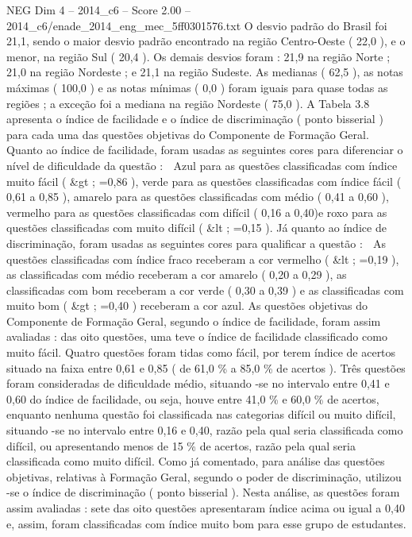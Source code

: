\begin{textsample}{NEG Dim 4 – 2014\_c6 – Score 2.00 – 2014\_c6/enade\_2014\_eng\_mec\_5ff0301576.txt}
O desvio padrão do Brasil foi 21,1, sendo o maior desvio padrão encontrado na região Centro-Oeste ( 22,0 ), e o menor, na região Sul ( 20,4 ).
Os demais desvios foram : 21,9 na região Norte ; 21,0 na região Nordeste ; e 21,1 na região Sudeste.
As medianas ( 62,5 ), as notas máximas ( 100,0 ) e as notas mínimas ( 0,0 ) foram iguais para quase todas as regiões ; a exceção foi a mediana na região Nordeste ( 75,0 ).
A Tabela 3.8 apresenta o índice de facilidade e o índice de discriminação ( ponto bisserial ) para cada uma das questões objetivas do Componente de Formação Geral.
Quanto ao índice de facilidade, foram usadas as seguintes cores para diferenciar o nível de dificuldade da questão :  Azul para as questões classificadas com índice muito fácil ( \&gt ; =0,86 ), verde para as questões classificadas com índice fácil ( 0,61 a 0,85 ), amarelo para as questões classificadas com médio ( 0,41 a 0,60 ), vermelho para as questões classificadas com difícil ( 0,16 a 0,40)e roxo para as questões classificadas com muito difícil ( \&lt ; =0,15 ).
Já quanto ao índice de discriminação, foram usadas as seguintes cores para qualificar a questão :  As questões classificadas com índice fraco receberam a cor vermelho ( \&lt ; =0,19 ), as classificadas com médio receberam a cor amarelo ( 0,20 a 0,29 ), as classificadas com bom receberam a cor verde ( 0,30 a 0,39 ) e as classificadas com muito bom ( \&gt ; =0,40 ) receberam a cor azul.
As questões objetivas do Componente de Formação Geral, segundo o índice de facilidade, foram assim avaliadas : das oito questões, uma teve o índice de facilidade classificado como muito fácil.
Quatro questões foram tidas como fácil, por terem índice de acertos situado na faixa entre 0,61 e 0,85 ( de 61,0 \% a 85,0 \% de acertos ).
Três questões foram consideradas de dificuldade médio, situando -se no intervalo entre 0,41 e 0,60 do índice de facilidade, ou seja, houve entre 41,0 \% e 60,0 \% de acertos, enquanto nenhuma questão foi classificada nas categorias difícil ou muito difícil, situando -se no intervalo entre 0,16 e 0,40, razão pela qual seria classificada como difícil, ou apresentando menos de 15 \% de acertos, razão pela qual seria classificada como muito difícil.
Como já comentado, para análise das questões objetivas, relativas à Formação Geral, segundo o poder de discriminação, utilizou -se o índice de discriminação ( ponto bisserial ).
Nesta análise, as questões foram assim avaliadas : sete das oito questões apresentaram índice acima ou igual a 0,40 e, assim, foram classificadas com índice muito bom para esse grupo de estudantes.

\end{textsample}
